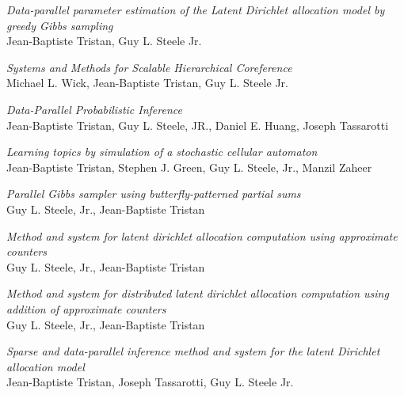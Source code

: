 \documentclass[margin,line]{res}
\begin{document}
\begin{resume}
\emph{Data-parallel parameter estimation of the Latent Dirichlet allocation model by greedy Gibbs sampling}\\
Jean-Baptiste Tristan, Guy L. Steele Jr.

\emph{Systems and Methods for Scalable Hierarchical Coreference}\\
Michael L. Wick, Jean-Baptiste Tristan, Guy L. Steele Jr.

\emph{Data-Parallel Probabilistic Inference}\\
Jean-Baptiste Tristan, Guy L. Steele, JR., Daniel E. Huang, Joseph Tassarotti

\emph{Learning topics by simulation of a stochastic cellular automaton}\\
Jean-Baptiste Tristan, Stephen J. Green, Guy L. Steele, Jr., Manzil Zaheer

\emph{Parallel Gibbs sampler using butterfly-patterned partial sums}\\
Guy L. Steele, Jr., Jean-Baptiste Tristan

\emph{Method and system for latent dirichlet allocation computation using approximate counters}\\
Guy L. Steele, Jr., Jean-Baptiste Tristan

\emph{Method and system for distributed latent dirichlet allocation computation using addition of approximate counters}\\
Guy L. Steele, Jr., Jean-Baptiste Tristan

\emph{Sparse and data-parallel inference method and system for the latent Dirichlet allocation model}\\
Jean-Baptiste Tristan, Joseph Tassarotti, Guy L. Steele Jr.




\end{resume}
\end{document}
